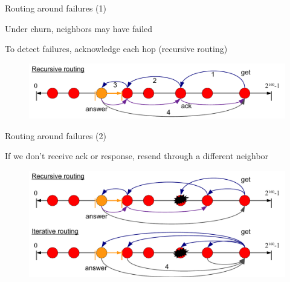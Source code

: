 \begin{frame}{Routing around failures (1)}

\BI
\item Under churn, neighbors may have failed
\item To detect failures, acknowledge each hop (recursive routing)
\EI

\begin{figure}
	\includegraphics[width=\textwidth]{dht-route-failure}
\end{figure}

\end{frame}

\begin{frame}{Routing around failures (2)}

\BI
\item If we don't receive ack or response, resend through a different neighbor
\EI

\begin{figure}
	\includegraphics[width=\textwidth]{dht-route-failure2}
\end{figure}

\end{frame}

